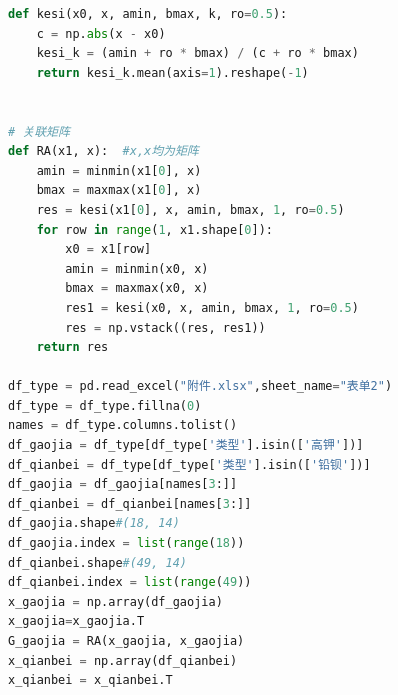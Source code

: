 \documentclass[withoutpreface,bwprint]{cumcmthesis} %
\begin{document}
\begin{appendices}
\begin{lstlisting}[language=Python]
def kesi(x0, x, amin, bmax, k, ro=0.5):
    c = np.abs(x - x0)
    kesi_k = (amin + ro * bmax) / (c + ro * bmax)
    return kesi_k.mean(axis=1).reshape(-1)


# 关联矩阵
def RA(x1, x):  #x,x均为矩阵
    amin = minmin(x1[0], x)
    bmax = maxmax(x1[0], x)
    res = kesi(x1[0], x, amin, bmax, 1, ro=0.5)
    for row in range(1, x1.shape[0]):
        x0 = x1[row]
        amin = minmin(x0, x)
        bmax = maxmax(x0, x)
        res1 = kesi(x0, x, amin, bmax, 1, ro=0.5)
        res = np.vstack((res, res1))
    return res

df_type = pd.read_excel("附件.xlsx",sheet_name="表单2")
df_type = df_type.fillna(0)
names = df_type.columns.tolist()
df_gaojia = df_type[df_type['类型'].isin(['高钾'])]
df_qianbei = df_type[df_type['类型'].isin(['铅钡'])]
df_gaojia = df_gaojia[names[3:]]
df_qianbei = df_qianbei[names[3:]]
df_gaojia.shape#(18, 14)
df_gaojia.index = list(range(18))
df_qianbei.shape#(49, 14)
df_qianbei.index = list(range(49))
x_gaojia = np.array(df_gaojia)
x_gaojia=x_gaojia.T
G_gaojia = RA(x_gaojia, x_gaojia)
x_qianbei = np.array(df_qianbei)
x_qianbei = x_qianbei.T
\end{lstlisting}

\end{appendices}
\end{document}
